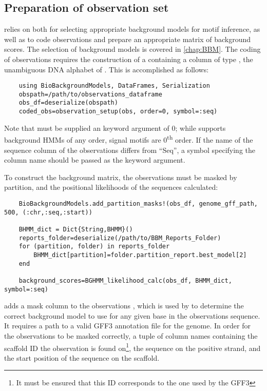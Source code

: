 \subsection{Preparation of observation set}
 relies on  both for selecting appropriate background models for motif inference, as well as to code observations and prepare an appropriate matrix of background scores. The selection of background models is covered in \autoref{chap:BBM}. The coding of observations requires the construction of a  containing a column of type , the unambiguous DNA alphabet of . This is accomplished as follows:

\begin{verbatim}
    using BioBackgroundModels, DataFrames, Serialization
    obspath=/path/to/observations_dataframe
    obs_df=deserialize(obspath)
    coded_obs=observation_setup(obs, order=0, symbol=:seq)\end{verbatim}

Note that  must be supplied an  keyword argument of 0; while  supports background HMMs of any order, signal motifs are 0\textsuperscript{th} order. If the name of the sequence column of the observations  differs from ``Seq'', a symbol specifying the column name should be passed as the  keyword argument.

To construct the background matrix, the observations must be masked by partition, and the positional likelihoods of the sequences calculated:

\begin{verbatim}
    BioBackgroundModels.add_partition_masks!(obs_df, genome_gff_path, 500, (:chr,:seq,:start))

    BHMM_dict = Dict{String,BHMM}()
    reports_folder=deserialize(/path/to/BBM_Reports_Folder)
    for (partition, folder) in reports_folder
        BHMM_dict[partition]=folder.partition_report.best_model[2]
    end

    background_scores=BGHMM_likelihood_calc(obs_df, BHMM_dict, symbol=:seq)\end{verbatim}

 adds a mask column to the observations , which is used by  to determine the correct background model to use for any given base in the observations sequence. It requires a path to a valid GFF3 annotation file for the genome. In order for the observations to be masked correctly, a tuple of column names containing the scaffold ID the observation is found on\footnote{It must be ensured that this ID corresponds to the one used by the GFF3}, the sequence on the positive strand, and the start position of the sequence on the scaffold.

